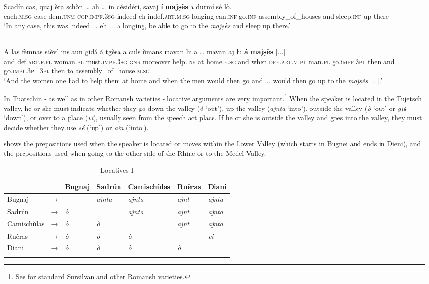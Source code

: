 \ea
\label{}
\\
\gll Scadín cas, quaj èra schòn … ah … in désidéri, savaj \textbf{í} \textbf{majṣès} a durmí sé lò.\\
each.\textsc{m.sg} case dem.\textsc{unm} \textsc{cop.impf.3sg} indeed {} eh {} indef.\textsc{art.m.sg} longing can.\textsc{inf} go.\textsc{inf} assembly\_of\_houses and sleep.\textsc{inf} up there\\
\glt `In any case, this was indeed ... eh ... a longing, be able to go to the \textit{majṣès} and sleep up there.'
\z

\ea
\label{}
\\
	\gll A las fèmnas stèv’ ins aun gidá á tgèsa a culs ùmans mavan lu a … mavan aj lu \textbf{á} \textbf{majṣès} [...].\\
and def.\textsc{art.f.pl} woman.\textsc{pl} must.\textsc{impf.3sg} \textsc{gnr} moreover help.\textsc{inf} at home.\textsc{f.sg} and when.\textsc{def.art.m.pl} man.\textsc{pl} go.i\textsc{mpf.3pl} then and {} go.\textsc{impf.3pl} \textsc{3pl} then to assembly\_of\_house.\textsc{m.sg}\\
\glt `And the women one had to help them at home and when the men would then go and ... would then go up to the \textit{majṣès} [...].'
\z


In Tuatschin - as well as in other Romansh varieties - locative arguments are very important.\footnote{See \citet[4-126]{Ebneter1994} for standard Sursilvan and other Romansh varieties.} When the speaker is located in the Tujetsch valley, he or she must indicate whether they go down the valley (\textit{ò} `out'), up the valley (\textit{ajnta} `into'), outside the valley (\textit{ò} `out' or \textit{gjù} `down'), or over to a place (\textit{vi}), usually seen from the speech act place. If he or she is outside the valley and goes into the valley, they must decide whether they use \textit{sé} (`up') or \textit{ajn} (`into').

 shows the prepositions used when the speaker is located or moves within the Lower Valley (which starts in Bugnei and ends in Dieni), and  the prepositions used when going to the other side of the Rhine or to the Medel Valley.

\begin{table}
	\caption{Locatives I}
	\label{loc1}
	\begin{tabular}{lllllll}
		\lsptoprule
		& & Bugnaj & Sadrún & Camischùlas & Ruèras & Diani \\
		\midrule
		Bugnaj  & →&   & \textit{ajnta} & \textit{ajnta} & \textit{ajnt} & \textit{ajnta}\\
		Sadrún & → & \textit{ò}  &  & \textit{ajnta} & \textit{ajnt} & \textit{ajnta}\\
		Camischùlas & →& \textit{ò} & \textit{ò} & & \textit{ajnt} & \textit{ajnta}\\
		Ruèras & →& \textit{ò} & \textit{ò} & \textit{ò} & & \textit{vi}\\
		Diani & →& \textit{ò} & \textit{ò} & \textit{ò} & \textit{ò} &\\
		\lspbottomrule
	\end{tabular}
\end{table}

